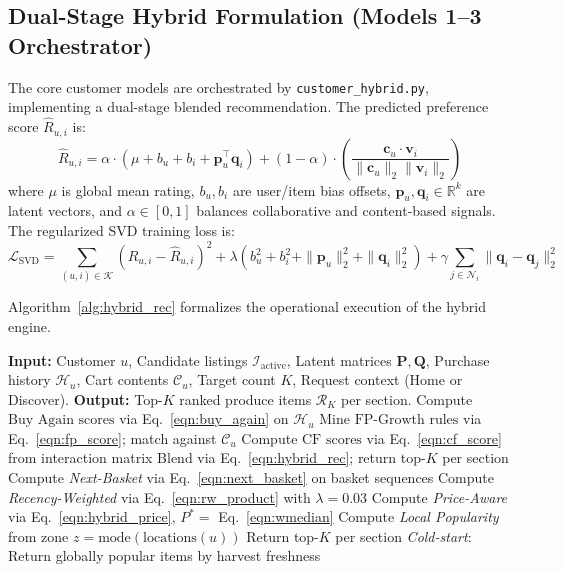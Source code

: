 \subsection{Dual-Stage Hybrid Formulation (Models 1--3 Orchestrator)}
\label{subsec:dual_hybrid}
The core customer models are orchestrated by \texttt{customer\_hybrid.py}, implementing a dual-stage blended recommendation. The predicted preference score $\hat{R}_{u, i}$ is:
\begin{equation}
\label{eqn:hybrid_rec}
\hat{R}_{u, i} = \alpha \cdot \left( \mu + b_u + b_i + \mathbf{p}_u^\top \mathbf{q}_i \right) + (1 - \alpha) \cdot \left( \frac{\mathbf{c}_u \cdot \mathbf{v}_i}{\|\mathbf{c}_u\|_2 \|\mathbf{v}_i\|_2} \right)
\end{equation}
where $\mu$ is global mean rating, $b_u, b_i$ are user/item bias offsets, $\mathbf{p}_u, \mathbf{q}_i \in \mathbb{R}^k$ are latent vectors, and $\alpha \in [0,1]$ balances collaborative and content-based signals. The regularized SVD training loss is:
\begin{equation}
\label{eqn:svd_loss_multiline}
\mathcal{L}_{\text{SVD}} = \sum_{(u, i) \in \mathcal{K}} \left( R_{u, i} - \hat{R}_{u, i} \right)^2 + \lambda \left( b_u^2 + b_i^2 + \|\mathbf{p}_u\|_2^2 + \|\mathbf{q}_i\|_2^2 \right) + \gamma \sum_{j \in \mathcal{N}_i} \|\mathbf{q}_i - \mathbf{q}_j\|_2^2
\end{equation}

Algorithm~\ref{alg:hybrid_rec} formalizes the operational execution of the hybrid engine.

\begin{algorithm}[h]
\caption{Seven-Model Hybrid Produce Recommendation Algorithm}
\label{alg:hybrid_rec}
\begin{algorithmic}[1]
\STATE \textbf{Input:} Customer $u$, Candidate listings $\mathcal{I}_{\text{active}}$, Latent matrices $\mathbf{P}, \mathbf{Q}$, Purchase history $\mathcal{H}_u$, Cart contents $\mathcal{C}_u$, Target count $K$, Request context (Home or Discover).
\STATE \textbf{Output:} Top-$K$ ranked produce items $\mathcal{R}_K$ per section.
    \STATE Compute $\text{Buy Again scores}$ via Eq.~\ref{eqn:buy_again} on $\mathcal{H}_u$
    \STATE Mine $\text{FP-Growth rules}$ via Eq.~\ref{eqn:fp_score}; match against $\mathcal{C}_u$
    \STATE Compute $\text{CF scores}$ via Eq.~\ref{eqn:cf_score} from interaction matrix
    \STATE Blend via Eq.~\ref{eqn:hybrid_rec}; return top-$K$ per section
    \STATE Compute \textit{Next-Basket} via Eq.~\ref{eqn:next_basket} on basket sequences
    \STATE Compute \textit{Recency-Weighted} via Eq.~\ref{eqn:rw_product} with $\lambda = 0.03$
    \STATE Compute \textit{Price-Aware} via Eq.~\ref{eqn:hybrid_price}, $P^* =$ Eq.~\ref{eqn:wmedian}
    \STATE Compute \textit{Local Popularity} from zone $z = \text{mode}(\text{locations}(u))$
    \STATE Return top-$K$ per section
\ELSE
    \STATE \textit{Cold-start}: Return globally popular items by harvest freshness
\ENDIF
\end{algorithmic}
\end{algorithm}

